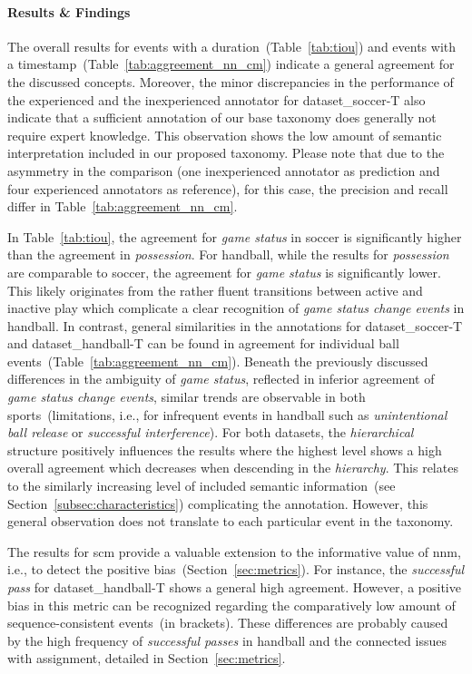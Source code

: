 \paragraph{Results \& Findings}

The overall results for events with a duration~(Table~\ref{tab:tiou}) and events with a timestamp~(Table~\ref{tab:aggreement_nn_cm}) indicate a general agreement for the discussed concepts.
Moreover, the minor discrepancies in the performance of the experienced and the inexperienced annotator for \acrshort{dataset_soccer}-T also indicate that a sufficient annotation of our base taxonomy does generally not require expert knowledge. This observation shows the low amount of semantic interpretation included in our proposed taxonomy. Please note that due to the asymmetry in the comparison (one inexperienced annotator as prediction and four experienced annotators as reference), for this case, the precision and recall differ in Table~\ref{tab:aggreement_nn_cm}.

In Table~\ref{tab:tiou}, the agreement for \textit{game status} in soccer is significantly higher than the agreement in \textit{possession}. For handball, while the results for \textit{possession} are comparable to soccer, the agreement for \textit{game status} is significantly lower. This likely originates from the rather fluent transitions between active and inactive play which complicate a clear recognition of \textit{game status change events} in handball.
In contrast, general similarities in the annotations for \acrshort{dataset_soccer}-T and \acrshort{dataset_handball}-T can be found in agreement for individual ball events~(Table~\ref{tab:aggreement_nn_cm}). Beneath the previously discussed differences in the ambiguity of \textit{game status}, reflected in inferior agreement of \textit{game status change events}, similar trends are observable in both sports~(limitations, i.e., for infrequent events in handball such as \textit{unintentional ball release} or \textit{successful interference}).
For both datasets, the \textit{hierarchical} structure positively influences the results where the highest level shows a high overall agreement which decreases when descending in the \textit{hierarchy}. This relates to the similarly increasing level of included semantic information~(see Section~\ref{subsec:characteristics}) complicating the annotation. However, this general observation does not translate to each particular event in the taxonomy. 

The results for \acrshort{scm} provide a valuable extension to the informative value of \acrshort{nnm}, i.e., to detect the positive bias~(Section~\ref{sec:metrics}). For instance, the \textit{successful pass} for \acrshort{dataset_handball}-T shows a general high agreement. However, a positive bias in this metric can be recognized regarding the comparatively low amount of sequence-consistent events~(in brackets). These differences are probably caused by the high frequency of \textit{successful passes} in handball and the connected issues with assignment, detailed in Section~\ref{sec:metrics}.  

